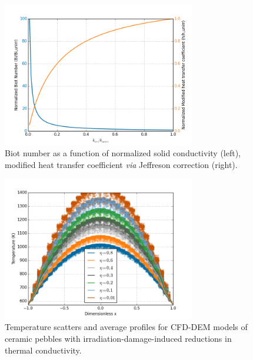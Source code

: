 \begin{figure}[ht]
    \centering
    \includegraphics[width = 0.75\textwidth]{figures/irradiated/biot-changes.png}
    \caption{Biot number as a function of normalized solid conductivity (left), modified heat transfer coefficient \textit{via} Jeffreson correction (right).}\label{fig:biot-changes}
\end{figure}

\begin{figure}[ht]
    \centering
    \includegraphics[width = 0.75\textwidth]{figures/irradiated/irradiated-temperatures-cfd-q.png}
    \caption{Temperature scatters and average profiles for CFD-DEM models of ceramic pebbles with irradiation-damage-induced reductions in thermal conductivity.}\label{fig:irrad-temps-cfd-q}
\end{figure}

